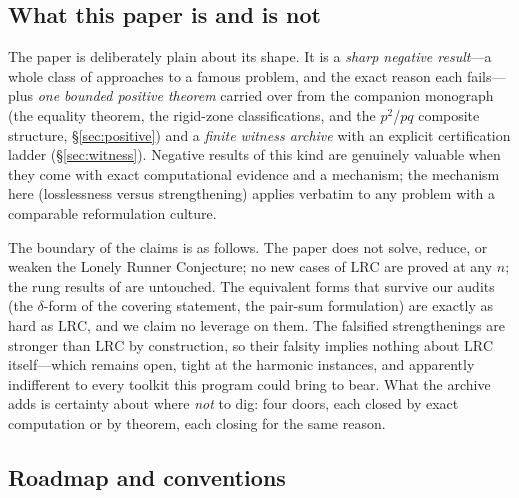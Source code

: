 \documentclass[11pt,a4paper]{article}
\numberwithin{equation}{section}
\theoremstyle{plain}
\theoremstyle{definition}
\theoremstyle{remark}
\newcommand{\lrc}{\mathrm{LRC}}
\begin{document}
\subsection{What this paper is and is not}

The paper is deliberately plain about its shape. It is a \emph{sharp
negative result}---a whole class of approaches to a famous problem, and
the exact reason each fails---plus \emph{one bounded positive theorem}
carried over from the companion monograph (the equality theorem, the
rigid-zone classifications, and the $p^2$/$pq$ composite structure,
\S\ref{sec:positive}) and a \emph{finite witness archive} with an explicit
certification ladder (\S\ref{sec:witness}). Negative results of this kind
are genuinely valuable when they come with exact computational evidence
and a mechanism; the mechanism here (losslessness versus strengthening)
applies verbatim to any problem with a comparable reformulation culture.

The boundary of the claims is as follows. The paper does not solve,
reduce, or weaken the Lonely Runner Conjecture; no new cases of $\lrc$
are proved at any $n$; the rung results of
\cite{Rosenfeld8,Trakulthongchai,Sungkawichai,Allikvere} are untouched.
The equivalent forms that survive our audits (the $\delta$-form of the
covering statement, the pair-sum formulation) are exactly as hard as
$\lrc$, and we claim no leverage on them. The falsified strengthenings
are stronger than $\lrc$ by construction, so their falsity implies
nothing about $\lrc$ itself---which remains open, tight at the harmonic
instances, and apparently indifferent to every toolkit this program could
bring to bear. What the archive adds is certainty about where \emph{not}
to dig: four doors, each closed by exact computation or by theorem, each
closing for the same reason.

\subsection{Roadmap and conventions}
\end{document}
